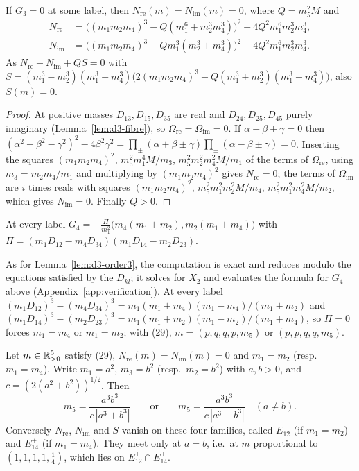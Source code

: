 \begin{corollary}\label{cor:d3-order3}
If $G_3=0$ at some label, then $N_{\mathrm{re}}(m)=N_{\mathrm{im}}(m)=0$, where $Q=m_5^2M$ and
\begin{align*}
N_{\mathrm{re}}&=\bigl((m_1m_2m_4)^3-Q(m_1^6+m_2^3m_4^3)\bigr)^2-4Q^2m_1^6m_2^3m_4^3,\\
N_{\mathrm{im}}&=\bigl((m_1m_2m_4)^3-Qm_1^3(m_2^3+m_4^3)\bigr)^2-4Q^2m_1^6m_2^3m_4^3 .
\end{align*}
As $N_{\mathrm{re}}-N_{\mathrm{im}}+QS=0$ with
$S=(m_1^3-m_2^3)(m_1^3-m_4^3)\bigl(2(m_1m_2m_4)^3-Q(m_1^3+m_2^3)(m_1^3+m_4^3)\bigr)$, also
$S(m)=0$.
\end{corollary}

\begin{proof}
At positive masses $D_{13},D_{15},D_{35}$ are real and $D_{24},D_{25},D_{45}$ purely imaginary
(Lemma~\ref{lem:d3-fibre}), so $\Omega_{\mathrm{re}}=\Omega_{\mathrm{im}}=0$.  If
$\alpha+\beta+\gamma=0$ then $(\alpha^2-\beta^2-\gamma^2)^2-4\beta^2\gamma^2=\prod_\pm(\alpha+\beta
\pm\gamma)\prod_\pm(\alpha-\beta\pm\gamma)=0$.  Inserting the squares $(m_1m_2m_4)^2$,
$m_5^2m_1^4M/m_3$, $m_5^2m_2^2m_4^2M/m_1$ of the terms of $\Omega_{\mathrm{re}}$, using
$m_3=m_2m_4/m_1$ and multiplying by $(m_1m_2m_4)^2$ gives $N_{\mathrm{re}}=0$; the terms of
$\Omega_{\mathrm{im}}$ are $i$ times reals with squares $(m_1m_2m_4)^2$, $m_5^2m_1^2m_2^2M/m_4$,
$m_5^2m_1^2m_4^2M/m_2$, which gives $N_{\mathrm{im}}=0$.  Finally $Q>0$.
\end{proof}

\begin{lemma}\label{lem:d3-order4}
At every label $G_4=-\frac{\Pi}{m_1^2}\bigl(m_4(m_1+m_2),m_2(m_1+m_4)\bigr)$ with
$\Pi=(m_1D_{12}-m_4D_{34})(m_1D_{14}-m_2D_{23})$.
\end{lemma}

As for Lemma~\ref{lem:d3-order3}, the computation is exact and reduces modulo the equations
satisfied by the $D_{kl}$; it solves for $X_2$ and evaluates the formula for $G_4$ above
(Appendix~\ref{app:verification}).  At every label
$(m_1D_{12})^3-(m_4D_{34})^3=m_1(m_1+m_4)(m_1-m_4)/(m_1+m_2)$ and
$(m_1D_{14})^3-(m_2D_{23})^3=m_1(m_1+m_2)(m_1-m_2)/(m_1+m_4)$, so $\Pi=0$ forces $m_1=m_4$ or
$m_1=m_2$; with (29), $m=(p,q,q,p,m_5)$ or $(p,p,q,q,m_5)$.

\begin{lemma}\label{lem:d3-curves}
Let $m\in\mathbb{R}_{>0}^5$ satisfy (29), $N_{\mathrm{re}}(m)=N_{\mathrm{im}}(m)=0$ and $m_1=m_2$ (resp.\
$m_1=m_4$).  Write $m_1=a^2$, $m_3=b^2$ (resp.\ $m_2=b^2$) with $a,b>0$, and
$c=(2(a^2+b^2))^{1/2}$.  Then
\[
m_5=\frac{a^3b^3}{c\,|a^3+b^3|}\qquad\text{or}\qquad m_5=\frac{a^3b^3}{c\,|a^3-b^3|}\quad(a\ne b).
\]
Conversely $N_{\mathrm{re}}$, $N_{\mathrm{im}}$ and $S$ vanish on these four families, called
$E^\pm_{12}$ (if $m_1=m_2$) and $E^\pm_{14}$ (if $m_1=m_4$).  They meet only at $a=b$, i.e.\ at
$m$ proportional to $(1,1,1,1,\frac14)$, which lies on $E^+_{12}\cap E^+_{14}$.
\end{lemma}


